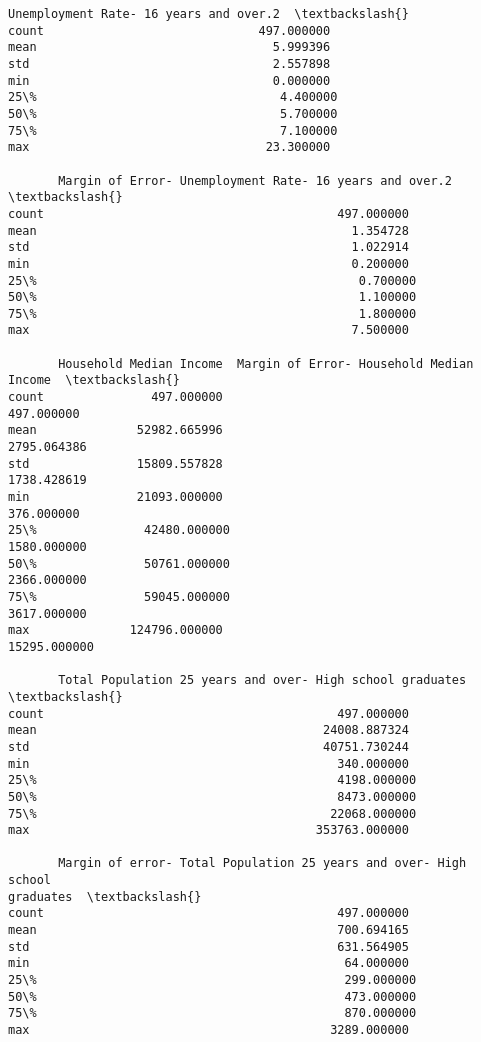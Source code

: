 \documentclass[11pt]{article}
\begin{document}
\begin{tcolorbox}[breakable, size=fbox, boxrule=.5pt, pad at break*=1mm, opacityfill=0]
\begin{Verbatim}[commandchars=\\\{\}]
       Unemployment Rate- 16 years and over.2  \textbackslash{}
count                              497.000000
mean                                 5.999396
std                                  2.557898
min                                  0.000000
25\%                                  4.400000
50\%                                  5.700000
75\%                                  7.100000
max                                 23.300000

       Margin of Error- Unemployment Rate- 16 years and over.2  \textbackslash{}
count                                         497.000000
mean                                            1.354728
std                                             1.022914
min                                             0.200000
25\%                                             0.700000
50\%                                             1.100000
75\%                                             1.800000
max                                             7.500000

       Household Median Income  Margin of Error- Household Median Income  \textbackslash{}
count               497.000000                                497.000000
mean              52982.665996                               2795.064386
std               15809.557828                               1738.428619
min               21093.000000                                376.000000
25\%               42480.000000                               1580.000000
50\%               50761.000000                               2366.000000
75\%               59045.000000                               3617.000000
max              124796.000000                              15295.000000

       Total Population 25 years and over- High school graduates  \textbackslash{}
count                                         497.000000
mean                                        24008.887324
std                                         40751.730244
min                                           340.000000
25\%                                          4198.000000
50\%                                          8473.000000
75\%                                         22068.000000
max                                        353763.000000

       Margin of error- Total Population 25 years and over- High school
graduates  \textbackslash{}
count                                         497.000000
mean                                          700.694165
std                                           631.564905
min                                            64.000000
25\%                                           299.000000
50\%                                           473.000000
75\%                                           870.000000
max                                          3289.000000


\end{Verbatim}
\end{tcolorbox}
\end{document}
